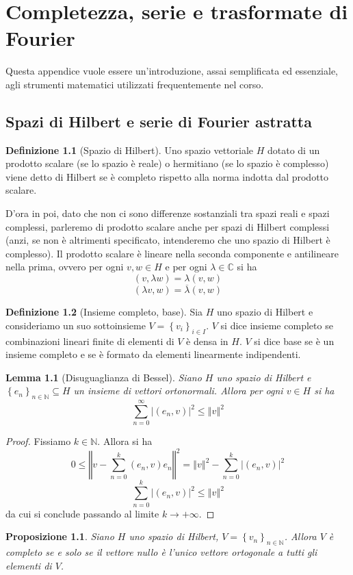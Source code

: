 \documentclass[a4paper,11pt]{book}
\newcommand{\C}{\mathbb{C}}
\newcommand{\norm}[1]{\left\Vert#1\right\Vert}
\theoremstyle{theorem}
\newtheorem{lemma}{Lemma}[section]
\newtheorem{proposizione}{Proposizione}[section]
\theoremstyle{definition}
\newtheorem{definizione}{Definizione}[section]
\begin{document}
\chapter{Completezza, serie e trasformate di Fourier}

	Questa appendice vuole essere un'introduzione, assai semplificata ed essenziale, agli strumenti matematici utilizzati frequentemente nel corso.
\section{Spazi di Hilbert e serie di Fourier astratta}
\begin{definizione}[Spazio di Hilbert]
	Uno spazio vettoriale $H$ dotato di un prodotto scalare (se lo spazio è reale) o hermitiano (se lo spazio è complesso) viene detto di Hilbert se è completo rispetto alla norma indotta dal prodotto scalare.
\end{definizione}
\noindent D'ora in poi, dato che non ci sono differenze sostanziali tra spazi reali e spazi complessi, parleremo di prodotto scalare anche per spazi di Hilbert complessi (anzi, se non è altrimenti specificato, intenderemo che uno spazio di Hilbert è complesso). Il prodotto scalare è lineare nella seconda componente e antilineare nella prima, ovvero per ogni $v,w\in H$ e per ogni $\lambda\in\C$ si ha
\[(v,\lambda w)=\lambda(v,w)\]
\[(\lambda v,w)=\overline{\lambda}(v,w)\]
\begin{definizione}[Insieme completo, base]
	Sia $H$ uno spazio di Hilbert e consideriamo un suo sottoinsieme $V=\left\{v_i\right\}_{i\in I}$. $V$ si dice insieme completo se combinazioni lineari finite di elementi di $V$ è densa in $H$. $V$ si dice base se è un insieme completo e se è formato da elementi linearmente indipendenti.
\end{definizione}
\begin{lemma}[Disuguaglianza di Bessel]
	Siano $H$ uno spazio di Hilbert e $\left\{e_{n}\right\}_{n\in\mathbb{N}}\subseteq H$ un insieme di vettori ortonormali. Allora per ogni $v\in H$ si ha
	\[\sum_{n=0}^{\infty}|(e_n,v)|^2\leq\norm{v}^2\]
\end{lemma}
\begin{proof}
	Fissiamo $k\in\mathbb{N}$. Allora si ha
	\[0\leq\norm{v-\sum_{n=0}^{k}(e_n,v)e_n}^2=\norm{v}^2-\sum_{n=0}^{k}|(e_n,v)|^2\]
	\[\sum_{n=0}^{k}|(e_n,v)|^2\leq \norm{v}^2\]
	da cui si conclude passando al limite $k\to+\infty$.
\end{proof}
\begin{proposizione}
	Siano $H$ uno spazio di Hilbert, $V=\left\{v_n\right\}_{n\in\mathbb{N}}$. Allora $V$ è completo se e solo se il vettore nullo è l'unico vettore ortogonale a tutti gli elementi di $V$.\label{proposizione}
\end{proposizione}
\end{document}
